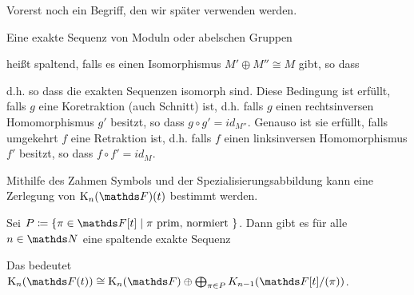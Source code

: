 \documentclass[ngerman,fontsize=11pt, paper=a4, parskip=half, titlepage=true, toc=bib]{scrartcl}
\begin{document}
Vorerst noch ein Begriff, den wir später verwenden werden.
\begin{Def}\label{spaltendeexaktesequenz}
  Eine exakte Sequenz von Moduln oder abelschen Gruppen
  \begin{center}
  \end{center}
  heißt spaltend, falls es einen Isomorphismus $M'\oplus M''\cong M$
  gibt, so dass
  \begin{center}
  \end{center}
  d.h. so dass die exakten Sequenzen isomorph sind.
  Diese Bedingung ist erfüllt, falls $g$ eine
  Koretraktion (auch Schnitt) ist, 
  d.h. falls $g$ einen rechtsinversen Homomorphismus
  $g'$ besitzt, so dass $g\circ g'=id_{M''}$.
  Genauso ist sie erfüllt, falls umgekehrt $f$ eine Retraktion ist,
  d.h. falls $f$ einen linksinversen Homomorphismus 
  $f'$ besitzt, so dass $f\circ f'=id_{M}$.
\end{Def}

Mithilfe des Zahmen Symbols und der Spezialisierungsabbildung kann
eine Zerlegung von $\KnF(t)$ bestimmt werden.

\begin{Satz}[Milnor]\label{milnorfolge}
  Sei $P\coloneqq \{\pi\in \F[t]\mid \pi\text{ prim, normiert }\}$.
  Dann gibt es für alle $n\in\N$ eine spaltende exakte Sequenz
  \begin{center}
  \end{center}
  Das bedeutet
  $\K_n(\Ft )\cong\KnF\oplus\bigoplus_{\pi\in P}K_{n-1}(\F[t]/(\pi))$.
\end{Satz}
\end{document}
